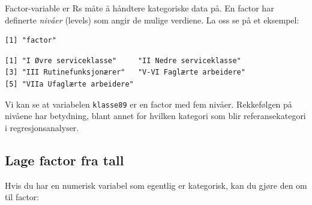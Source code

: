 \documentclass[
  norsk,
  letterpaper,
  DIV=11,
  numbers=noendperiod]{scrreprt}
\newenvironment{Shaded}{\begin{snugshade}}{\end{snugshade}}
\newcommand{\AttributeTok}[1]{\textcolor[rgb]{0.40,0.45,0.13}{#1}}
\newcommand{\DecValTok}[1]{\textcolor[rgb]{0.68,0.00,0.00}{#1}}
\newcommand{\FunctionTok}[1]{\textcolor[rgb]{0.28,0.35,0.67}{#1}}
\newcommand{\NormalTok}[1]{\textcolor[rgb]{0.00,0.23,0.31}{#1}}
\newcommand{\OtherTok}[1]{\textcolor[rgb]{0.00,0.23,0.31}{#1}}
\newcommand{\SpecialCharTok}[1]{\textcolor[rgb]{0.37,0.37,0.37}{#1}}
\newcommand{\StringTok}[1]{\textcolor[rgb]{0.13,0.47,0.30}{#1}}
\theoremstyle{definition}
\theoremstyle{remark}
\begin{document}
Factor-variable er Rs måte å håndtere kategoriske data på. En factor har
definerte \emph{nivåer} (levels) som angir de mulige verdiene. La oss se
på et eksempel:

\begin{Shaded}
\end{Shaded}

\begin{verbatim}
[1] "factor"
\end{verbatim}

\begin{Shaded}
\end{Shaded}

\begin{verbatim}
[1] "I Øvre serviceklasse"     "II Nedre serviceklasse"  
[3] "III Rutinefunksjonærer"   "V-VI Faglærte arbeidere" 
[5] "VIIa Ufaglærte arbeidere"
\end{verbatim}

Vi kan se at variabelen \texttt{klasse89} er en factor med fem nivåer.
Rekkefølgen på nivåene har betydning, blant annet for hvilken kategori
som blir referansekategori i regresjonsanalyser.

\subsection{Lage factor fra tall}\label{lage-factor-fra-tall}

Hvis du har en numerisk variabel som egentlig er kategorisk, kan du
gjøre den om til factor:

\begin{Shaded}
\end{Shaded}
\end{document}
